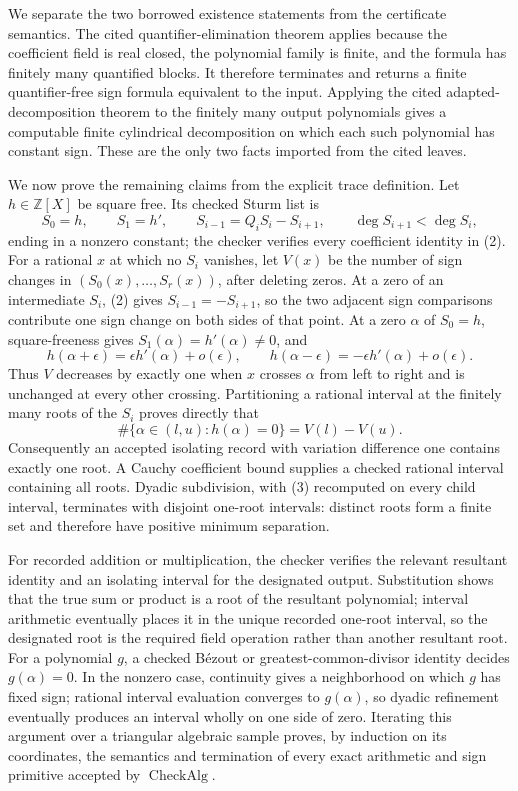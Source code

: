We separate the two borrowed existence statements from the certificate semantics.  The cited quantifier-elimination theorem applies because the coefficient field is real closed, the polynomial family is finite, and the formula has finitely many quantified blocks.  It therefore terminates and returns a finite quantifier-free sign formula equivalent to the input.  Applying the cited adapted-decomposition theorem to the finitely many output polynomials gives a computable finite cylindrical decomposition on which each such polynomial has constant sign.  These are the only two facts imported from the cited leaves.

We now prove the remaining claims from the explicit trace definition.  Let \(h\in\mathbb Z[X]\) be square free.  Its checked Sturm list is
\[
S_0=h,\qquad S_1=h',\qquad
S_{i-1}=Q_iS_i-S_{i+1},\qquad \deg S_{i+1}<\deg S_i,
\tag{2}
\]
ending in a nonzero constant; the checker verifies every coefficient identity in (2).  For a rational \(x\) at which no \(S_i\) vanishes, let \(V(x)\) be the number of sign changes in \((S_0(x),\ldots,S_r(x))\), after deleting zeros.  At a zero of an intermediate \(S_i\), (2) gives \(S_{i-1}=-S_{i+1}\), so the two adjacent sign comparisons contribute one sign change on both sides of that point.  At a zero \(\alpha\) of \(S_0=h\), square-freeness gives \(S_1(\alpha)=h'(\alpha)\ne0\), and
\[
h(\alpha+\epsilon)=\epsilon h'(\alpha)+o(\epsilon),
\qquad
h(\alpha-\epsilon)=-\epsilon h'(\alpha)+o(\epsilon).
\]
Thus \(V\) decreases by exactly one when \(x\) crosses \(\alpha\) from left to right and is unchanged at every other crossing.  Partitioning a rational interval at the finitely many roots of the \(S_i\) proves directly that
\[
\#\{\alpha\in(l,u):h(\alpha)=0\}=V(l)-V(u).
\tag{3}
\]
Consequently an accepted isolating record with variation difference one contains exactly one root.  A Cauchy coefficient bound supplies a checked rational interval containing all roots.  Dyadic subdivision, with (3) recomputed on every child interval, terminates with disjoint one-root intervals: distinct roots form a finite set and therefore have positive minimum separation.

For recorded addition or multiplication, the checker verifies the relevant resultant identity and an isolating interval for the designated output.  Substitution shows that the true sum or product is a root of the resultant polynomial; interval arithmetic eventually places it in the unique recorded one-root interval, so the designated root is the required field operation rather than another resultant root.  For a polynomial \(g\), a checked Bézout or greatest-common-divisor identity decides \(g(\alpha)=0\).  In the nonzero case, continuity gives a neighborhood on which \(g\) has fixed sign; rational interval evaluation converges to \(g(\alpha)\), so dyadic refinement eventually produces an interval wholly on one side of zero.  Iterating this argument over a triangular algebraic sample proves, by induction on its coordinates, the semantics and termination of every exact arithmetic and sign primitive accepted by \(\operatorname{CheckAlg}\).

